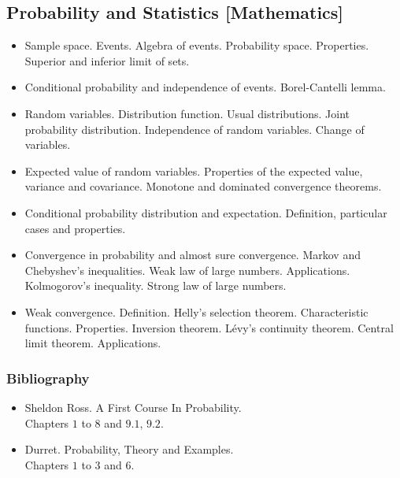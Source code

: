 \documentclass[spanish]{article}
\begin{document}
\hrulefill%
\subsection{Probability and Statistics [Mathematics]}

\begin{itemize}
  \item
Sample space. Events. Algebra of events. Probability space. Properties. Superior and inferior limit of sets.

  \item
Conditional probability and independence of events. Borel-Cantelli lemma.

  \item
Random variables. Distribution function. Usual distributions. Joint probability distribution. Independence of random variables. Change of variables.

  \item
Expected value of random variables. Properties of the expected value, variance and covariance. Monotone and dominated convergence theorems.

  \item
Conditional probability distribution and expectation. Definition, particular cases and properties.

  \item
Convergence in probability and almost sure convergence. Markov and Chebyshev's inequalities. Weak law of large numbers. Applications. Kolmogorov's inequality. Strong law of large numbers.

  \item
Weak convergence. Definition. Helly's selection theorem. Characteristic functions. Properties. Inversion theorem. Lévy's continuity theorem. Central limit theorem. Applications.
\end{itemize}

\subsubsection{Bibliography}
\begin{itemize}
  \item Sheldon Ross. A First Course In Probability.\\
    Chapters $1$ to $8$ and $9.1$, $9.2$.

  \item Durret. Probability, Theory and Examples.\\
    Chapters $1$ to $3$ and $6$.
\end{itemize}
\end{document}
